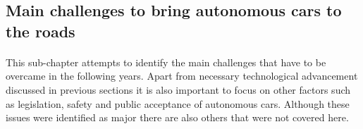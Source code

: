 \documentclass[11pt,english]{article}
\begin{document}







\par


\subsection{Main challenges to bring autonomous cars to the roads}
\paragraph{}
This sub-chapter attempts to identify the main challenges that have to be overcame in the following years. Apart from necessary technological advancement discussed in previous sections it is also important to focus on other factors such as legislation, safety and public acceptance of autonomous cars. Although these issues were identified as major there are also others that were not covered here.
\end{document}
